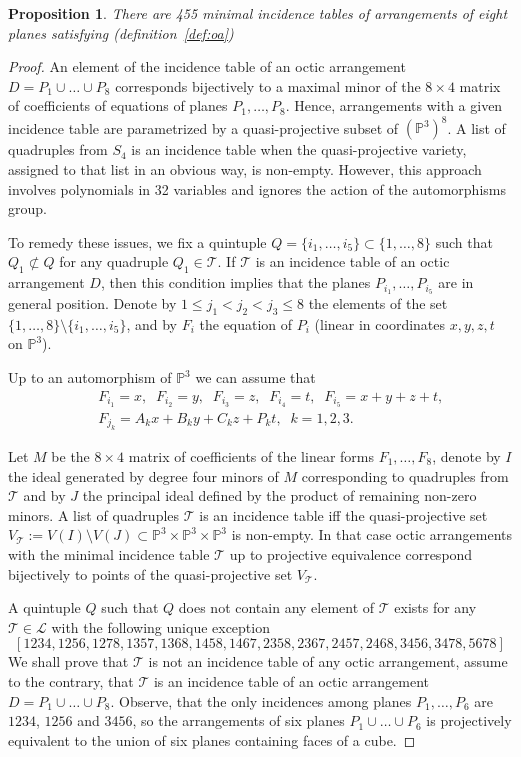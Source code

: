 \documentclass[12pt]{amsart}
\theoremstyle{plain}
\newtheorem{prop}[theorem]{Proposition}
\theoremstyle{remark}
\theoremstyle{definition}
\newcommand{\PP}{\mathbb P}
\numberwithin{table}{section}
\begin{document}
\begin{prop}\label{prop:it455}
	There are 455 minimal incidence tables of arrangements of
	eight planes satisfying (definition~\ref{def:oa})
\end{prop}
\begin{proof}
	An element of the incidence table of an octic arrangement $D=P_{1}\cup\dots\cup P_{8}$ corresponds bijectively to a maximal minor of the $8\times4$ matrix of coefficients of equations of planes $P_{1},\dots,P_{8}$. Hence, arrangements with a given incidence table are parametrized by a quasi-projective subset of $(\mathbb P^{3})^{8}$. A list of quadruples from $S_{4}$ is an incidence table when the quasi-projective variety, assigned to that list in an obvious way, is non-empty.
	However, this approach involves polynomials in 32 variables and ignores the action of the automorphisms group.

	To remedy these issues, we fix a quintuple $Q=\{i_{1},\dots,i_{5}\}\subset\{1,\dots,8\}$ such that $Q_{1}\not\subset
	Q$ for any quadruple $Q_{1}\in\mathcal T$.
	If $\mathcal T$ is an incidence table of an octic arrangement $D$, then this condition implies that the planes $P_{i_{1}},\dots,P_{i_{5}}$ are in general position.
	Denote by $1\le j_{1}<j_{2}<j_{3}\le 8$ the
	elements of the set $\{1,\dots,8\}\setminus\{i_{1},\dots,i_{5}\}$, and by $F_{i}$ the equation of $P_{i}$ (linear in coordinates $x,y,z,t$ on $\PP^{3}$).

	Up to an automorphism of $\PP^{3}$  we can assume that
	\begin{eqnarray*}
		&&F_{i_{1}}=x,\;\; F_{i_{2}}=y,\;\; F_{i_{3}}=z,\;\; F_{i_{4}}=t,\;\;
		F_{i_{5}}=x+y+z+t,\\
		&&F_{j_{k}}=A_{k}x+B_{k}y+C_{k}z+P_{k}t,\;\; k=1,2,3.
	\end{eqnarray*}

	Let $M$ be the $8\times4$ matrix of coefficients of the linear forms
	$F_{1},\dots,F_{8}$, denote by $I$ the ideal generated by degree four
	minors of $M$ corresponding to quadruples from $\mathcal T$ and by $J$
	the principal ideal defined by the product of remaining non-zero minors. A list
	of quadruples $\mathcal T$ is an incidence table iff the
	quasi-projective set $V_{\mathcal T}:=V(I)\setminus V(J)\subset \PP^{3}\times\PP^{3}\times \PP^{3} $ is non-empty.
	In that case octic arrangements with the minimal incidence table $\mathcal T$ up to  projective equivalence correspond bijectively to points of the quasi-projective set  $V_{\mathcal T}$.

	A quintuple $Q$ such that $Q$ does not contain any element of $\mathcal T$ exists for any $\mathcal T\in\mathcal L$ with the following unique exception
	\[
	[1234, 1256, 1278, 1357, 1368, 1458, 1467, 2358, 2367, 2457, 2468, 3456, 3478, 5678]
	\]
	We shall prove that $\mathcal T$ is not an incidence table of any octic arrangement, assume to the contrary, that $\mathcal T $ is an incidence table of an octic arrangement $D=P_{1}\cup\dots\cup P_{8}$.
	Observe, that the only incidences among planes $P_{1},\dots,P_{6}$ are
	$1234$, $1256$ and $3456$, so the arrangements of six planes $P_{1}\cup\dots\cup P_{6}$ is projectively equivalent to the union of six planes containing faces of a cube.


\end{proof}
\end{document}
